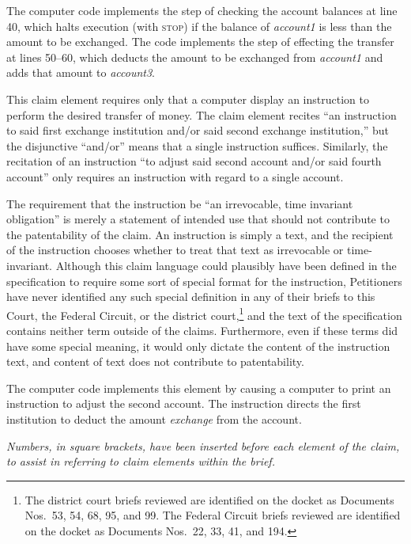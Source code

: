 \documentclass{scotus}
\begin{document}
The computer code implements the step of checking the account balances at line
40, which halts execution (with \textsc{stop}) if the balance of
\emph{account1} is less than the amount to be exchanged. The code implements the
step of effecting the transfer at lines 50--60, which deducts the amount to be
exchanged from \emph{account1} and adds that amount to \emph{account3}.


This claim element requires only that a computer display an instruction to
perform the desired transfer of money. The claim element recites ``an
instruction to said first exchange institution and/or said second exchange
institution,'' but the disjunctive ``and/or'' means that a single instruction
suffices. Similarly, the recitation of an instruction ``to adjust said second
account and/or said fourth account'' only requires an instruction with regard to
a single account.

The requirement that the instruction be ``an irrevocable, time invariant
obligation'' is merely a statement of intended use that should not contribute to
the patentability of the claim. An instruction is simply a text, and the
recipient of the instruction chooses whether to treat that text as irrevocable
or time-invariant. Although this claim language could plausibly have been
defined in the specification to require some sort of special format for the
instruction, Petitioners have never identified any such special definition in
any of their briefs to this Court, the Federal Circuit, or the district
court,\footnote{The district court briefs reviewed are identified on the docket
as Documents Nos.\ 53, 54, 68, 95, and 99. The Federal Circuit briefs reviewed
are identified on the docket as Documents Nos.\ 22, 33, 41, and 194.}
and the text of the
specification contains neither term outside of the claims. Furthermore, even if
these terms did have some special meaning, it would only dictate the content of
the instruction text, and content of text does not contribute to patentability.

The computer code implements this element by causing a computer to print an
instruction to adjust the second account. The instruction directs the
first institution to deduct the amount \emph{exchange} from the account.


\emph{Numbers, in square brackets, have been inserted before each element of the
claim, to assist in referring to claim elements within the brief.}

\wholeclaim
\end{document}

